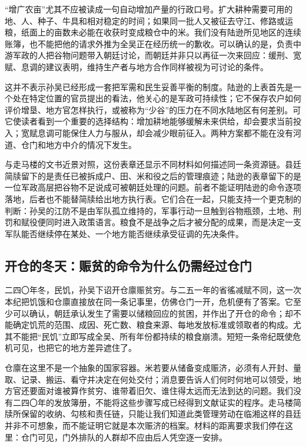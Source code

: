 “增广农亩”尤其不应被读成一句自动增加产量的行政口号。扩大耕种需要可用的地、人、种子、牛具和相对稳定的时间；如果同一批人又被征去守江、修路或运粮，纸面上的亩数未必能在收获时变成粮仓中的米。我们没有陆逊所见地区的连续账簿，也不能把他的请求外推为全吴正在经历统一的歉收。可以确认的是，负责中游军政的人把谷物问题带入朝廷讨论，而朝廷并非只以再征一次来回应：缓刑、宽赋、息调的建议表明，维持生产者与地方合作同样被视为可讨论的条件。

这并不表示孙吴已经形成一套把军需和民生妥善平衡的制度。陆逊的上表首先是一个处在特定位置的官员提出的看法，他关心的是军政可持续性；它不保存农户如何评价增垦、地方官怎样执行，或被称为“少谷”的压力在不同水陆地区有何差别。可它使读者看到一个重要的选择结构：增加耕地能够缓解未来供给，却会要求当前投入；宽赋息调可能保住人力与服从，却会减少眼前征入。两种方案都不能在没有河道、仓门和地方中介的情况下发生。

与走马楼的文书近景对照，这份表章还显示不同材料如何描述同一条资源链。县廷简牍留下的是责任已被拆成户、田、米和役之后的管理痕迹；陆逊的表章留下的是一位军政高层把谷物不足说成可被朝廷处理的问题。前者不能证明陆逊的命令逐项落地，后者也不能替简牍给出地方执行表。它们合在一起，只能支持一个更克制的判断：孙吴的江防不是由军队孤立维持的，军事行动一旦触到谷物瓶颈，土地、刑罚和赋役便同时进入政策语言。粮食不是战争之后才被分配的成果，而是决定一支军队能否继续停在某处、一个地方能否继续承受征调的先决条件。

\subsection{开仓的冬天：赈贫的命令为什么仍需经过仓门}
二四〇年冬，民饥，孙吴下诏开仓廪赈贫穷。与二五一年的省徭减赋不同，这一次本纪把饥饿和仓廪直接放在同一条记事里，仿佛仓门一开，危机便有了答案。它至少可以确认，朝廷承认发生了需要以储粮回应的贫困，并作出了开仓的命令；却不能确定饥荒的范围、成因、死亡数、粮食来源、每地发放标准或领取者的构成。尤其不能把“民饥”立即写成全吴、所有年份都持续的粮食崩溃。短短一条帝纪既使危机可见，也把它的地方差异遮住了。

仓廪在这里不是一个抽象的国家容器。米若要从储备变成赈济，必须有人开封、量取、记录、搬运、看守并决定在何处交付；消息要告诉人们何时何地可以领受，地方官还要面对谁被算作贫穷、谁带着旧欠、谁住得太远而无法到达的问题。我们没有二四〇年的发放簿册，不能将这些步骤写成已经得到文献证实的程序。走马楼简牍所保留的收纳、勾核和责任链，只能让我们知道此类管理劳动在临湘这样的县廷并非不可想象，而不能证明它就是本次赈济的档案。材料的距离要求我们停在这里：仓门可见，门外排队的人群却不应由后人凭空逐一安排。

